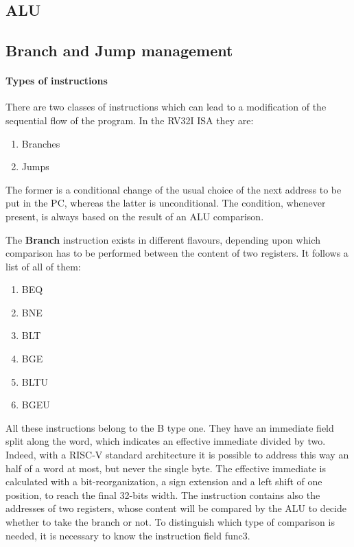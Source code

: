 \documentclass[a4paper]{article}
\begin{document}
\subsection{ALU}

\subsection{Branch and Jump management}
\paragraph{Types of instructions}
There are two classes of instructions which can lead to a modification of the sequential flow of the program. In the RV32I ISA they are:
\begin{enumerate}
	\item Branches
	\item Jumps
\end{enumerate} 
The former is a conditional change of the usual choice of the next address to be put in the PC, whereas the latter is unconditional. The condition, whenever present, is always based on the result of an ALU comparison.

The \textbf{Branch} instruction exists in different flavours, depending upon which comparison has to be performed between the content of two registers. It follows a list of all of them:
\begin{enumerate}
	\item BEQ
	\item BNE
	\item BLT
	\item BGE
	\item BLTU
	\item BGEU
\end{enumerate} 
All these instructions belong to the B type one. They have an immediate field split along the word, which indicates an effective immediate divided by two. Indeed, with a RISC-V standard architecture it is possible to address this way an half of a word at most, but never the single byte.
The effective immediate is calculated with a bit-reorganization, a sign extension and a left shift of one position, to reach the final 32-bits width.
The instruction contains also the addresses of two registers, whose content will be compared by the ALU to decide whether to take the branch or not. 
To distinguish which type of comparison is needed, it is necessary to know the instruction field func3.
\end{document}
